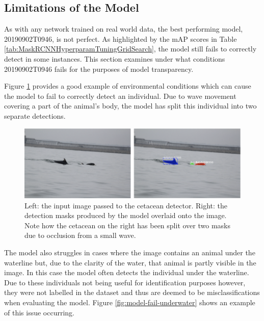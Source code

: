 \subsection{Limitations of the Model}\label{ch:cetDet,sec:ModelSelection,sub:LimitationsOfBest}

As with any network trained on real world data, the best performing model, 20190902T0946, is not perfect. As highlighted by the mAP scores in Table \ref{tab:MaskRCNNHyperparamTuningGridSearch}, the model still fails to correctly detect in some instances. This section examines under what conditions 20190902T0946 fails for the purposes of model transparency. 

Figure \ref{fig:model-fail-bad-detection-and-split-individual} provides a good example of environmental conditions which can cause the model to fail to correctly detect an individual. Due to wave movement covering a part of the animal's body, the model has split this individual into two separate detections.

\begin{figure}[h]
	\begin{center}
		\includegraphics[scale=0.6]{Chapter4/figs/model-fail-split-individual.png}
	\end{center}
	\caption[Left: the input image passed to the cetacean detector. Right: the detection masks produced by the model overlaid onto the image.]{Left: the input image passed to the cetacean detector. Right: the detection masks produced by the model overlaid onto the image. Note how the cetacean on the right has been split over two masks due to occlusion from a small wave.}
	\label{fig:model-fail-bad-detection-and-split-individual}
\end{figure}
 
The model also struggles in cases where the image contains an animal under the waterline but, due to the clarity of the water, that animal is partly visible in the image. In this case the model often detects the individual under the waterline. Due to these individuals not being useful for identification purposes however, they were not labelled in the dataset and thus are deemed to be misclassifications when evaluating the model. Figure \ref{fig:model-fail-underwater} shows an example of this issue occurring.

